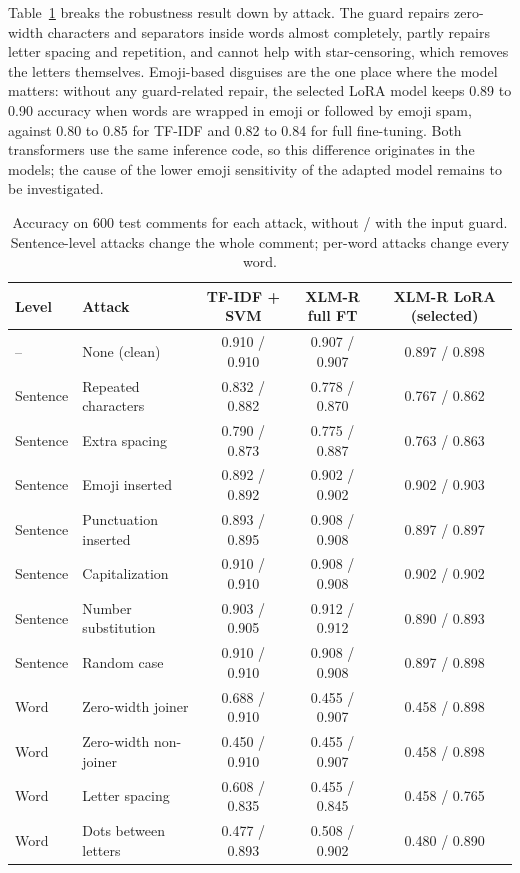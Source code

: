\documentclass[conference]{IEEEtran}
\begin{document}
Table~\ref{tab:attacks} breaks the robustness result down by attack. The guard repairs zero-width characters and separators inside words almost completely, partly repairs letter spacing and repetition, and cannot help with star-censoring, which removes the letters themselves. Emoji-based disguises are the one place where the model matters: without any guard-related repair, the selected LoRA model keeps 0.89 to 0.90 accuracy when words are wrapped in emoji or followed by emoji spam, against 0.80 to 0.85 for TF-IDF and 0.82 to 0.84 for full fine-tuning. Both transformers use the same inference code, so this difference originates in the models; the cause of the lower emoji sensitivity of the adapted model remains to be investigated.

\begin{table}[t]
\caption{Accuracy on 600 test comments for each attack, without / with the input guard. Sentence-level attacks change the whole comment; per-word attacks change every word.}
\label{tab:attacks}
\centering
\footnotesize
\setlength{\tabcolsep}{6pt}
\begin{tabular}{llccc}
\toprule
Level & Attack & TF-IDF + SVM & XLM-R full FT & XLM-R LoRA (selected) \\
\midrule
-- & None (clean) & 0.910 / 0.910 & 0.907 / 0.907 & 0.897 / 0.898 \\
Sentence & Repeated characters & 0.832 / 0.882 & 0.778 / 0.870 & 0.767 / 0.862 \\
Sentence & Extra spacing & 0.790 / 0.873 & 0.775 / 0.887 & 0.763 / 0.863 \\
Sentence & Emoji inserted & 0.892 / 0.892 & 0.902 / 0.902 & 0.902 / 0.903 \\
Sentence & Punctuation inserted & 0.893 / 0.895 & 0.908 / 0.908 & 0.897 / 0.897 \\
Sentence & Capitalization & 0.910 / 0.910 & 0.908 / 0.908 & 0.902 / 0.902 \\
Sentence & Number substitution & 0.903 / 0.905 & 0.912 / 0.912 & 0.890 / 0.893 \\
Sentence & Random case & 0.910 / 0.910 & 0.908 / 0.908 & 0.897 / 0.898 \\
Word & Zero-width joiner & 0.688 / 0.910 & 0.455 / 0.907 & 0.458 / 0.898 \\
Word & Zero-width non-joiner & 0.450 / 0.910 & 0.455 / 0.907 & 0.458 / 0.898 \\
Word & Letter spacing & 0.608 / 0.835 & 0.455 / 0.845 & 0.458 / 0.765 \\
Word & Dots between letters & 0.477 / 0.893 & 0.508 / 0.902 & 0.480 / 0.890 \\

\end{tabular}
\end{table}
\end{document}
